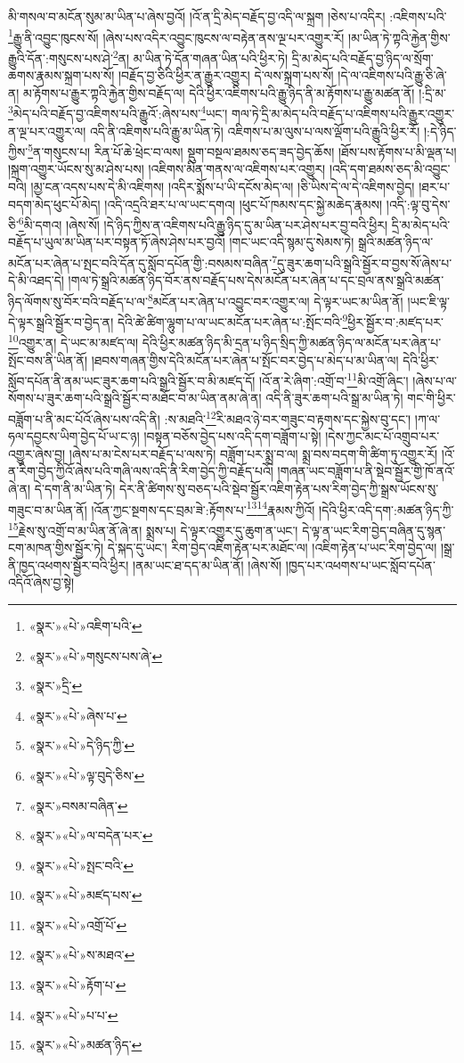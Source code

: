 མི་གསལ་བ་མངོན་སུམ་མ་ཡིན་པ་ཞེས་བྱའོ། །འོ་ན་དྲི་མེད་བརྗོད་བྱ་འདི་ལ་སྐྲག །ཅེས་པ་འདིར། :འཇིགས་པའི་\footnote{«སྣར་»«པེ་»འཇིག་པའི་}རྒྱུ་ནི་འབྱུང་ཁུངས་སོ། །ཞེས་པས་འདིར་འབྱུང་ཁུངས་ལ་བརྟེན་ནས་ལྔ་པར་འགྱུར་རོ། །མ་ཡིན་ཏེ་ཀྟའི་རྐྱེན་གྱིས་རྒྱུའི་དོན་:གསུངས་པས་ཤེ་\footnote{«སྣར་»«པེ་»གསུངས་པས་ཞེ་}ན། མ་ཡིན་ཏེ་དོན་གཞན་ཡིན་པའི་ཕྱིར་ཏེ། དྲི་མ་མེད་པའི་བརྗོད་བྱ་ཉིད་ལ་སྲོག་ཆགས་རྣམས་སྐྲག་པས་སོ། །བརྗོད་བྱ་ཅིའི་ཕྱིར་ན་རྒྱུར་འགྱུར། དེ་ལས་སྐྲག་པས་སོ། །དེ་ལ་འཇིགས་པའི་རྒྱུ་ཅི་ཞེ་ན། མ་རྟོགས་པ་རྒྱུར་ཀྟའི་རྐྱེན་གྱིས་བརྗོད་ལ། དེའི་ཕྱིར་འཇིགས་པའི་རྒྱུ་ཉིད་ནི་མ་རྟོགས་པ་རྒྱུ་མཚན་ནོ། །:དྲི་མ་\footnote{«སྣར་»དྲི་}མེད་པའི་བརྗོད་བྱ་འཇིགས་པའི་རྒྱུའོ་:ཞེས་པས་\footnote{«སྣར་»«པེ་»ཞེས་པ་}ཡང་། གལ་ཏེ་དྲི་མ་མེད་པའི་བརྗོད་པ་འཇིགས་པའི་རྒྱུར་འགྱུར་ན་ལྔ་པར་འགྱུར་ལ། འདི་ནི་འཇིགས་པའི་རྒྱུ་མ་ཡིན་ཏེ། འཇིགས་པ་མ་ལུས་པ་ལས་ལྡོག་པའི་རྒྱུའི་ཕྱིར་རོ། །:དེ་ཉིད་ཀྱིས་\footnote{«སྣར་»«པེ་»དེ་ཉིད་ཀྱི་}ན་གསུངས་པ། རིན་པོ་ཆེ་ཕྲེང་བ་ལས། སྡུག་བསྔལ་ཐམས་ཅད་ཟད་བྱེད་ཆོས། །ཐོས་པས་རྟོགས་པ་མི་ལྡན་པ། །སྐྲག་འགྱུར་ཡོངས་སུ་མ་ཤེས་པས། །འཇིགས་མིན་གནས་ལ་འཇིགས་པར་འགྱུར། །འདི་དག་ཐམས་ཅད་མི་འབྱུང་བའི། །མྱ་ངན་འདས་པས་དེ་མི་འཇིགས། །འདིར་སྨོས་པ་ཡི་དངོས་མེད་ལ། །ཅི་ཡིས་དེ་ལ་དེ་འཇིགས་བྱེད། །ཐར་པ་བདག་མེད་ཕུང་པོ་མེད། །འདི་འདྲའི་ཐར་པ་ལ་ཡང་དགའ། །ཕུང་པོ་ཁམས་དང་སྐྱེ་མཆེད་རྣམས། །འདི་:ལྟ་བུ་དེས་ཅི་\footnote{«སྣར་»«པེ་»ལྟ་བུདེ་ཅིས་}མི་དགའ། །ཞེས་སོ། །དེ་ཉིད་ཀྱིས་ན་འཇིགས་པའི་རྒྱུ་ཉིད་དུ་མ་ཡིན་པར་ཤེས་པར་བྱ་བའི་ཕྱིར། དྲི་མ་མེད་པའི་བརྗོད་པ་ཡུལ་མ་ཡིན་པར་བསྟན་ཏོ་ཞེས་ཤེས་པར་བྱའོ། །གང་ཡང་འདི་སྙམ་དུ་སེམས་ཏེ། སྒྲའི་མཚན་ཉིད་ལ་མངོན་པར་ཞེན་པ་སྤང་བའི་དོན་དུ་སློབ་དཔོན་གྱི་:བསམས་བཞིན་\footnote{«སྣར་»བསམ་བཞིན་}དུ་ཟུར་ཆག་པའི་སྒྲའི་སྦྱོར་བ་བྱས་སོ་ཞེས་པ་དེ་མི་འཐད་དེ། །གལ་ཏེ་སྒྲའི་མཚན་ཉིད་བོར་ནས་བརྗོད་པས་དེས་མངོན་པར་ཞེན་པ་དང་བྲལ་ནས་སྒྲའི་མཚན་ཉིད་ལོགས་སུ་བོར་བའི་བརྗོད་པ་ལ་\footnote{«སྣར་»«པེ་»ལ་བདེན་པར་}མངོན་པར་ཞེན་པ་འབྱུང་བར་འགྱུར་ལ། དེ་ལྟར་ཡང་མ་ཡིན་ནོ། །ཡང་ཇི་ལྟ་དེ་ལྟར་སྒྲའི་སྦྱོར་བ་བྱེད་ན། དེའི་ཚེ་ཚིག་ལྷུག་པ་ལ་ཡང་མངོན་པར་ཞེན་པ་:སྤོང་བའི་\footnote{«སྣར་»«པེ་»སྤང་བའི་}ཕྱིར་སྦྱོར་བ་:མཛད་པར་\footnote{«སྣར་»«པེ་»མཛད་པས་}འགྱུར་ན། དེ་ཡང་མ་མཛད་ལ། དེའི་ཕྱིར་མཚན་ཉིད་མི་དྲན་པ་ཉིད་སྲིད་ཀྱི་མཚན་ཉིད་ལ་མངོན་པར་ཞེན་པ་སྤོང་བས་ནི་ཡིན་ནོ། །ཐབས་གཞན་གྱིས་དེའི་མངོན་པར་ཞེན་པ་སྤོང་བར་བྱེད་པ་མེད་པ་མ་ཡིན་ལ། དེའི་ཕྱིར་སློབ་དཔོན་ནི་ནམ་ཡང་ཟུར་ཆག་པའི་སྒྲའི་སྦྱོར་བ་མི་མཛད་དོ། །འོ་ན་རེ་ཞིག་:འགྲོ་བ་\footnote{«སྣར་»«པེ་»འགྲོ་པོ་}མི་འགྲོ་ཞིང་། །ཞེས་པ་ལ་སོགས་པ་ཟུར་ཆག་པའི་སྒྲའི་སྦྱོར་བ་མཐོང་བ་མ་ཡིན་ནམ་ཞེ་ན། འདི་ནི་ཟུར་ཆག་པའི་སྒྲ་མ་ཡིན་ཏེ། གང་གི་ཕྱིར་བཟློག་པ་ནི་མང་པོའོ་ཞེས་པས་འདི་ནི། :ས་མཐའི་\footnote{«སྣར་»«པེ་»ས་མཐའ་}རི་མཐའ་ཉེ་བར་གཟུང་བ་རྟགས་དང་སྐྱེས་བུ་དང་། །ཀ་ལ་ཧལ་དབྱངས་ཡིག་བྱེད་པོ་ཡ་ང་ཉ། །བསྟན་བཅོས་བྱེད་པས་འདི་དག་བཟློག་པ་སྟེ། །དེས་ཀྱང་མང་པོ་འགྲུབ་པར་འགྱུར་ཞེས་བྱ། །ཞེས་པ་མ་ངེས་པར་བརྗོད་པ་ལས་ཏེ། བཟློག་པར་སྨྲ་བ་ལ། སྨྲ་བས་བདག་གི་ཚིག་ཏུ་འགྱུར་རོ། །འོ་ན་རིག་བྱེད་ཀྱིའོ་ཞེས་པའི་གཞི་ལས་འདི་ནི་རིག་བྱེད་ཀྱི་བརྗོད་པའོ། །གཞན་ཡང་བཟློག་པ་ནི་སྡེབ་སྦྱོར་གྱི་ཁོ་ནའོ་ཞེ་ན། དེ་དག་ནི་མ་ཡིན་ཏེ། དེར་ནི་ཚིགས་སུ་བཅད་པའི་སྡེབ་སྦྱོར་འཇིག་རྟེན་པས་རིག་བྱེད་ཀྱི་སྒྲས་ཡོངས་སུ་གཟུང་བ་མ་ཡིན་ནོ། །འོན་ཀྱང་སྔགས་དང་བྲམ་ཟེ་:རྟོགས་པ་\footnote{«སྣར་»«པེ་»རྟོག་པ་}\footnote{«སྣར་»«པེ་»པ་པ་}རྣམས་ཀྱིའོ། །དེའི་ཕྱིར་འདི་དག་:མཚན་ཉིད་ཀྱི་\footnote{«སྣར་»«པེ་»མཚན་ཉིད་}རྗེས་སུ་འགྲོ་བ་མ་ཡིན་ནོ་ཞེ་ན། སྨྲས་པ། དེ་ལྟར་འགྱུར་དུ་ཆུག་ན་ཡང་། དེ་ལྟ་ན་ཡང་རིག་བྱེད་བཞིན་དུ་སྙན་ངག་མཁན་གྱིས་སྦྱོར་ཏེ། དེ་སྐད་དུ་ཡང་། རིག་བྱེད་འཇིག་རྟེན་པར་མཐོང་ལ། །འཇིག་རྟེན་པ་ཡང་རིག་བྱེད་ལ། །སྒྲ་ནི་ཁྱད་འཕགས་སྦྱོར་བའི་ཕྱིར། །ནམ་ཡང་ཐ་དད་མ་ཡིན་ནོ། །ཞེས་སོ། །ཁྱད་པར་འཕགས་པ་ཡང་སློབ་དཔོན་འདིའོ་ཞེས་བྱ་སྟེ། 